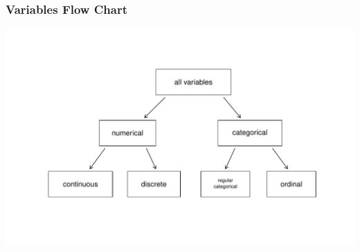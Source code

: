 \documentclass[handout]{beamer}
\begin{document}
\begin{frame}[fragile]
\frametitle{Variables Flow Chart}

\begin{center}
\includegraphics[width=\linewidth]{figure/flow-chart} 
\end{center}

\end{frame}



%
%
%
\end{document}
